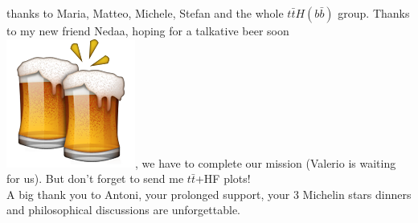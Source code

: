thanks to Maria, Matteo, Michele, Stefan and the whole $t\bar{t}H(b\bar{b})$ group. Thanks to my new friend Nedaa, hoping for a talkative beer soon \includegraphics[height=1.5\fontcharht\font`A]{figures/ack/EmojiObjects/EmojiObjects-177.png}, we have to complete our mission (Valerio is waiting for us). But don't forget to send me $t\bar{t}$+HF plots! \\ A big thank you to Antoni, your prolonged support, your 3 Michelin stars dinners and philosophical discussions are unforgettable.\\ 


